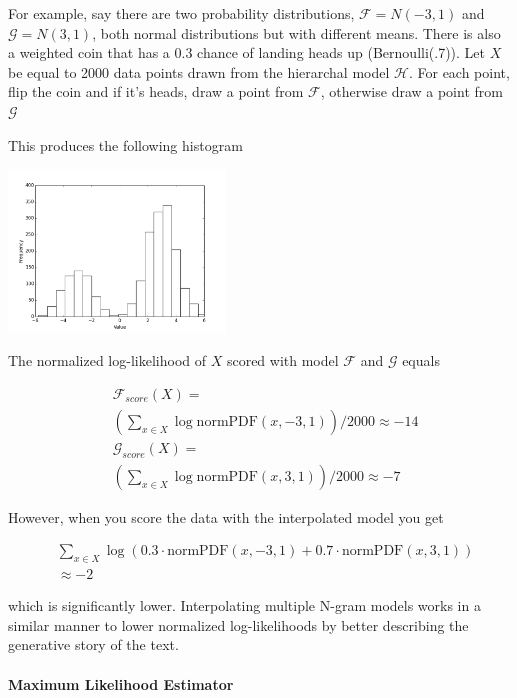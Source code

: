 \documentclass[11pt]{article}
\begin{document}
For example, say there are two probability distributions, $\mathcal{F} = N\left(-3, 1\right)$ and $\mathcal{G} = N\left(3, 1 \right)$, both normal distributions but with different means. There is also a weighted coin that has a $0.3$ chance of landing heads up (Bernoulli(.7)). Let $X$ be equal to 2000 data points drawn from the hierarchal model $\mathcal{H}$. For each point, flip the coin and if it's heads, draw a point from $\mathcal{F}$, otherwise draw a point from $\mathcal{G}$

This produces the following histogram

\includegraphics[width=218px]{graphs/hist.png}

The normalized log-likelihood of $X$ scored with model $\mathcal{F}$ and $\mathcal{G}$ equals

\begin{align*}
&\mathcal{F}_{score}\left(X\right) = \\
& \left(\sum\limits_{x \in X} \log \text{normPDF}\left(x, -3, 1\right)\right) / 2000 \approx -14 \\
&\mathcal{G}_{score}\left(X\right) = \\
&\left(\sum\limits_{x \in X} \log \text{normPDF}\left(x, 3, 1\right)\right) / 2000 \approx -7
\end{align*}

However, when you score the data with the interpolated model you get

\begin{align*}
&\sum\limits_{x \in X} \log \left( 0.3 \cdot \text{normPDF}\left(x, -3, 1\right) + 0.7 \cdot \text{normPDF}\left(x, 3, 1\right) \right) \\
&\approx -2
\end{align*}

which is significantly lower. Interpolating multiple N-gram models works in a similar manner to lower normalized log-likelihoods by better describing the generative story of the text.

\paragraph{Maximum Likelihood Estimator}
\end{document}
